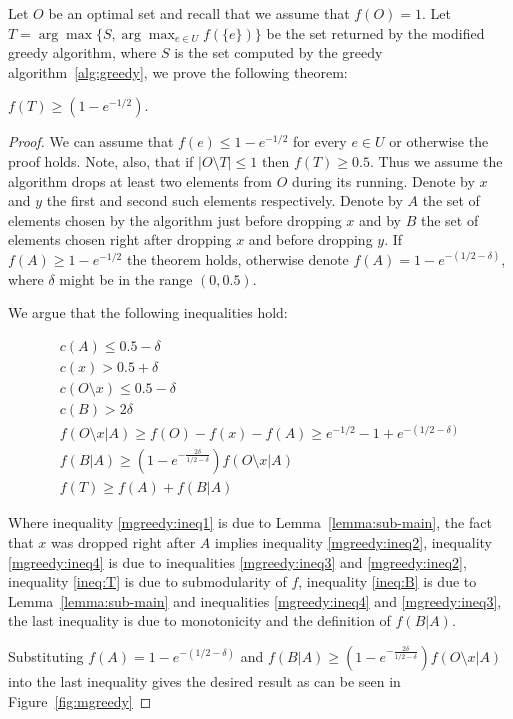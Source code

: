 Let $O$ be an optimal set and recall that we assume that $f(O) = 1$.
Let $T = \arg\max\{S, \displaystyle{\arg\max_{e \in U}}f(\{e\})\}$ 
be the set returned by the modified greedy algorithm, 
where $S$ is the set computed by the greedy algorithm~\ref{alg:greedy},
we prove the following theorem:

\begin{theorem}
$f(T) \geq (1 - e^{-1/2})$.
\end{theorem}

\begin{proof}
We can assume that $f(e) \leq 1 - e^{-1/2}$ for every $e \in U$ or otherwise the proof holds. 
Note, also, that if $|O \setminus T| \leq 1$ then $f(T) \geq 0.5$. 
Thus we assume the algorithm drops at least two elements from $O$ during its running. 
Denote by $x$ and $y$ the first and second such elements respectively.
Denote by $A$ the set of elements chosen by the algorithm just before dropping $x$ and by
$B$ the set of elements chosen right after dropping $x$ and before dropping $y$.
If $f(A) \geq 1 - e^{-1/2}$ the theorem holds, otherwise denote $f(A) = 1 - e^{-(1/2 - \delta)}$,
where $\delta$ might be in the range $(0, 0.5)$.  

We argue that the following inequalities hold:

\begin{align}
\label{mgreedy:ineq1}
c(A) \leq 0.5 - \delta 
\\
\label{mgreedy:ineq2}
c(x) > 0.5 + \delta
\\
\label{mgreedy:ineq3}
c(O \setminus x) \leq 0.5 - \delta
\\
\label{mgreedy:ineq4}
c(B) > 2\delta
\\
\label{ineq:T}
f(O \setminus x | A) \geq f(O) - f(x) - f(A) \geq e^{-1/2} - 1 + e^{-(1/2 - \delta)}
\\
\label{ineq:B}
f(B|A) \geq (1 - e^{-\frac{2\delta}{1/2 - \delta}})f(O \setminus x | A)
\\
f(T) \geq f(A) + f(B|A)
\end{align}

Where inequality \ref{mgreedy:ineq1} is due to Lemma~\ref{lemma:sub-main},
the fact that $x$ was dropped right after $A$ implies inequality \ref{mgreedy:ineq2},
inequality \ref{mgreedy:ineq4} is due to inequalities \ref{mgreedy:ineq3} and 
\ref{mgreedy:ineq2},
inequality \ref{ineq:T} is due to submodularity of $f$, 
inequality \ref{ineq:B} is due to Lemma~\ref{lemma:sub-main} and inequalities 
\ref{mgreedy:ineq4} and \ref{mgreedy:ineq3}, 
the last inequality is due to monotonicity and the definition of $f(B|A)$.   

Substituting $f(A) = 1 - e^{-(1/2 - \delta)}$ 
and $f(B|A) \geq (1 - e^{-\frac{2\delta}{1/2 - \delta}})f(O \setminus x | A)$
into the last inequality gives the desired result as can be seen in Figure~\ref{fig:mgreedy}
\end{proof}


